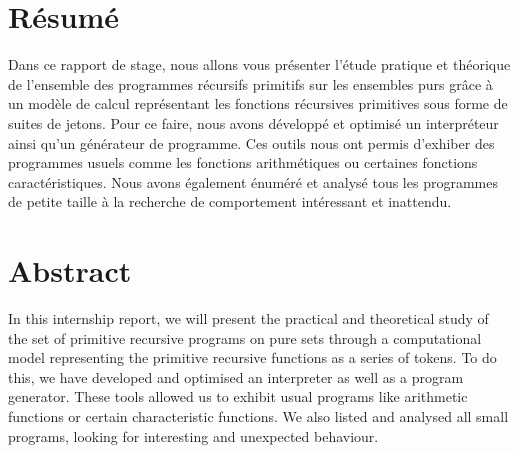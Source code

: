 \documentclass[a4paper, 11pt]{article}
\begin{document}
\begin{center}
    \bigskip
    \section*{Résumé}

    Dans ce rapport de stage, nous allons vous présenter l'étude pratique
    et théorique de l’ensemble des programmes récursifs primitifs 
    sur les ensembles purs grâce à un modèle de calcul représentant les
    fonctions récursives primitives sous forme de suites de jetons.
    Pour ce faire, nous avons développé et optimisé un interpréteur 
    ainsi qu'un générateur de programme. Ces outils nous ont permis 
    d'exhiber des programmes usuels comme les fonctions arithmétiques ou certaines
    fonctions caractéristiques. Nous avons également énuméré et analysé
    tous les programmes de petite taille à la recherche de comportement
    intéressant et inattendu.

    \medskip

    \section*{Abstract}

    In this internship report, we will present the practical 
    and theoretical study of the set of primitive recursive
    programs on pure sets through a computational model representing 
    the primitive recursive functions as a series of tokens. 
    To do this, we have developed and optimised an interpreter as well 
    as a program generator. These tools allowed us to exhibit usual 
    programs like arithmetic functions or certain characteristic functions.
    We also listed and analysed all small programs, 
    looking for interesting and unexpected behaviour.

\end{center}
\end{document}
